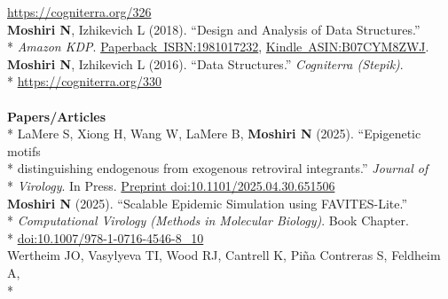 \documentclass[margin,line]{res}
\begin{document}
\begin{resume}
\hspace*{8mm} \href{https://cogniterra.org/326}{https://cogniterra.org/326}\\
\hspace*{4mm} \textbf{Moshiri N}, Izhikevich L (2018). ``Design and Analysis of Data Structures.''\\*\vspace{2mm}
\hspace*{8mm} \textit{Amazon KDP}. \href{https://www.amazon.com/dp/1981017232}{Paperback~ISBN:1981017232}, \href{https://www.amazon.com/dp/B07CYM8ZWJ}{Kindle~ASIN:B07CYM8ZWJ}.\\
\hspace*{4mm} \textbf{Moshiri N}, Izhikevich L (2016). ``Data Structures.'' \textit{Cogniterra (Stepik)}.\\*\vspace{2mm}
\hspace*{8mm} \href{https://cogniterra.org/330}{https://cogniterra.org/330}\\
~\\
\textbf{Papers/Articles}\vspace{2mm}\\*
\hspace*{4mm} LaMere S, Xiong H, Wang W, LaMere B, \textbf{Moshiri N} (2025). ``Epigenetic motifs\\*
\hspace*{9.5mm} distinguishing endogenous from exogenous retroviral integrants.'' \textit{Journal of}\\*\vspace{2mm}
\hspace*{8mm} \textit{Virology}. In Press. \href{https://doi.org/10.1101/2025.04.30.651506}{Preprint doi:10.1101/2025.04.30.651506}\\
\hspace*{4mm} \textbf{Moshiri N} (2025). ``Scalable Epidemic Simulation using FAVITES-Lite.''\\*
\hspace*{9.5mm} \textit{Computational Virology (Methods in Molecular Biology)}. Book Chapter.\\*\vspace{2mm}
\hspace*{8mm} \href{https://doi.org/10.1007/978-1-0716-4546-8_10}{doi:10.1007/978-1-0716-4546-8\_10}\\
\hspace*{4mm} Wertheim JO, Vasylyeva TI, Wood RJ, Cantrell K, Pi{\~n}a Contreras S, Feldheim A,\\*

\end{resume}
\end{document}
